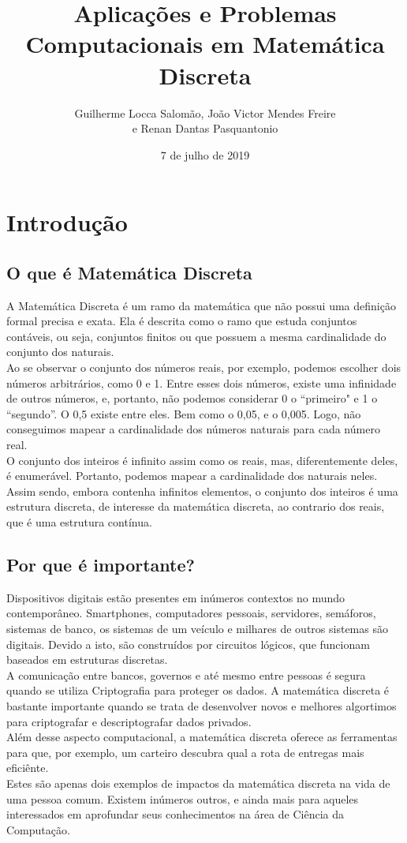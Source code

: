 \documentclass{article}
\title{Aplicações e Problemas Computacionais em Matemática Discreta}
\author{Guilherme Locca Salomão, João Victor Mendes Freire \\e Renan Dantas Pasquantonio }
\date{7 de julho de 2019}
\begin{document}
\maketitle

\section{Introdução}
    \subsection{O que é Matemática Discreta}
    
    A Matemática Discreta é um ramo da matemática que não possui uma definição formal precisa e exata. Ela é descrita como o ramo que estuda conjuntos contáveis, ou seja, conjuntos finitos ou que possuem a mesma cardinalidade do conjunto dos naturais.\\
    Ao se observar o conjunto dos números reais, por exemplo, podemos escolher dois números arbitrários, como 0 e 1. Entre esses dois números, existe uma infinidade de outros números, e, portanto, não podemos considerar 0 o “primeiro" e 1 o “segundo”. O 0,5 existe entre eles. Bem como o 0,05, e o 0,005. Logo, não conseguimos mapear a cardinalidade dos números naturais para cada número real.\\
    O conjunto dos inteiros é infinito assim como os reais, mas, diferentemente deles, é enumerável. Portanto, podemos mapear a cardinalidade dos naturais neles. \\
    Assim sendo, embora contenha infinitos elementos, o conjunto dos inteiros é uma estrutura discreta, de interesse da matemática discreta, ao contrario dos reais, que é uma estrutura contínua.
    
    
    \subsection{Por que é importante?}
    Dispositivos digitais estão presentes em inúmeros contextos no mundo contemporâneo. Smartphones, computadores pessoais, servidores, semáforos, sistemas de banco, os sistemas de um veículo e milhares de outros sistemas são digitais. Devido a isto, são construídos por circuitos lógicos, que funcionam baseados em estruturas discretas.\\
    A comunicação entre bancos, governos e até mesmo entre pessoas é segura quando se utiliza Criptografia para proteger os dados. A matemática discreta é bastante importante quando se trata de desenvolver novos e melhores algortimos para criptografar e descriptografar dados privados.\\
    Além desse aspecto computacional, a matemática discreta oferece as ferramentas para que, por exemplo, um carteiro descubra qual a rota de entregas mais eficiênte.\\
    Estes são apenas dois exemplos de impactos da matemática discreta na vida de uma pessoa comum. Existem inúmeros outros, e ainda mais para aqueles interessados em aprofundar seus conhecimentos na área de Ciência da Computação.\\
    
\end{document}

